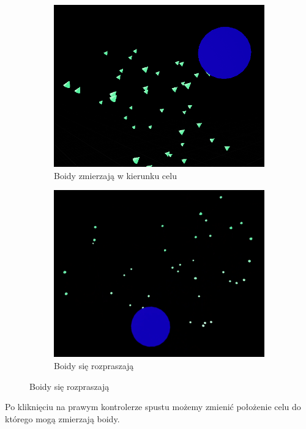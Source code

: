 \documentclass[a4paper,12pt,reqno]{article}
\begin{document}
\begin{figure}[H]%
	\centering
	\begin{subfigure}{.5\textwidth}
		\centering
		\includegraphics[width=0.8\linewidth]{graphics//boids/BoidsInUE_1.png}
		\caption{Boidy zmierzają w kierunku celu }	
		\label{ref:subref_a}
	\end{subfigure}%
	\begin{subfigure}{.5\textwidth}
		\centering
		\includegraphics[width=0.8\linewidth]{graphics//boids/BoidsInUE_2.png}
		\caption{Boidy się rozpraszają}
		\label{ref:subref_b}
	\end{subfigure}%
\label{ref:ref}
\end{figure}

Po kliknięciu na prawym kontrolerze spustu możemy zmienić położenie celu do którego mogą zmierzają boidy.
\end{document}
